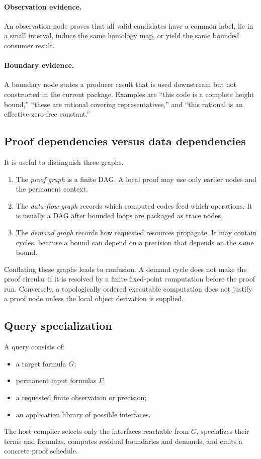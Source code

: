 \paragraph{Observation evidence.}
An observation node proves that all valid candidates have a common label, lie in a small interval, induce the same homology map, or yield the same bounded consumer result.

\paragraph{Boundary evidence.}
A boundary node states a producer result that is used downstream but not constructed in the current package.  Examples are ``this code is a complete height bound,'' ``these are rational covering representatives,'' and ``this rational is an effective zero-free constant.''

\subsection{Proof dependencies versus data dependencies}

It is useful to distinguish three graphs.

\begin{enumerate}
\item The \emph{proof graph} is a finite DAG.  A local proof may use only earlier nodes and the permanent context.
\item The \emph{data-flow graph} records which computed codes feed which operations.  It is usually a DAG after bounded loops are packaged as trace nodes.
\item The \emph{demand graph} records how requested resources propagate.  It may contain cycles, because a bound can depend on a precision that depends on the same bound.
\end{enumerate}

Conflating these graphs leads to confusion.  A demand cycle does not make the proof circular if it is resolved by a finite fixed-point computation before the proof run.  Conversely, a topologically ordered executable computation does not justify a proof node unless the local object derivation is supplied.

\subsection{Query specialization}

A query consists of:
\begin{itemize}
\item a target formula \(G\);
\item permanent input formulas \(\Gamma\);
\item a requested finite observation or precision;
\item an application library of possible interfaces.
\end{itemize}
The host compiler selects only the interfaces reachable from \(G\), specializes their terms and formulas, computes residual boundaries and demands, and emits a concrete proof schedule.

